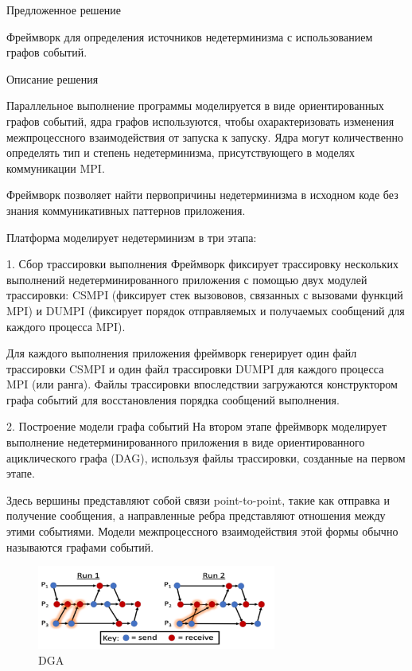 Предложенное решение

Фреймворк для определения источников недетерминизма с использованием графов событий. 
\newline

Описание решения

Параллельное выполнение программы моделируется в виде ориентированных графов событий, ядра графов используются, чтобы охарактеризовать изменения межпроцессного взаимодействия от запуска к запуску. Ядра могут количественно определять тип и степень недетерминизма, присутствующего в моделях коммуникации MPI.

Фреймворк позволяет найти первопричины недетерминизма в исходном коде без знания коммуникативных паттернов приложения.
 
Платформа моделирует недетерминизм в три этапа: 

1.	Сбор трассировки выполнения
Фреймворк фиксирует трассировку нескольких выполнений недетерминированного приложения с помощью двух модулей трассировки: CSMPI (фиксирует стек вызововов, связанных с вызовами функций MPI) и DUMPI (фиксирует порядок отправляемых и получаемых сообщений для каждого процесса MPI).

Для каждого выполнения приложения фреймворк генерирует один файл трассировки CSMPI и один файл трассировки DUMPI для каждого процесса MPI (или ранга). Файлы трассировки впоследствии загружаются конструктором графа событий для восстановления порядка сообщений выполнения.
\newline

2.	Построение модели графа событий
На втором этапе фреймворк моделирует выполнение недетерминированного приложения в виде ориентированного ациклического графа (DAG), используя файлы трассировки, созданные на первом этапе.

Здесь вершины представляют собой связи point-to-point, такие как отправка и получение сообщения, а направленные ребра представляют отношения между этими событиями. Модели межпроцессного взаимодействия этой формы обычно называются графами событий.

\begin{figure}[h]
	\centering
	\includegraphics[width=0.7\textwidth]{ResearchNotes/rndhpc_not_edt_2021_11_10/krekhtunova/dga.png}
	\caption{DGA} 
\end{figure}

